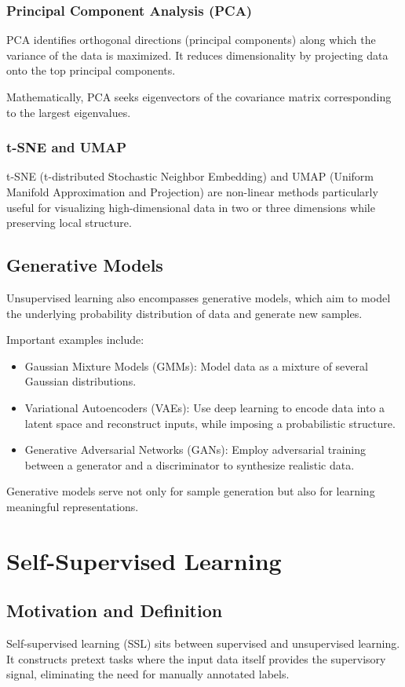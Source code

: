 \documentclass[openany]{book}
\begin{document}
\subsubsection{Principal Component Analysis (PCA)}
PCA identifies orthogonal directions (principal components) along which the 
variance of the data is maximized. It reduces dimensionality by projecting data 
onto the top principal components.

Mathematically, PCA seeks eigenvectors of the covariance matrix corresponding to 
the largest eigenvalues.

\subsubsection{t-SNE and UMAP}
t-SNE (t-distributed Stochastic Neighbor Embedding) and UMAP (Uniform Manifold 
Approximation and Projection) are non-linear methods particularly useful for 
visualizing high-dimensional data in two or three dimensions while preserving 
local structure.

\subsection{Generative Models}
Unsupervised learning also encompasses generative models, which aim to model the 
underlying probability distribution of data and generate new samples.

Important examples include:
\begin{itemize}
    \item Gaussian Mixture Models (GMMs): Model data as a mixture of several 
    Gaussian distributions.
    \item Variational Autoencoders (VAEs): Use deep learning to encode data into 
    a latent space and reconstruct inputs, while imposing a probabilistic 
    structure.
    \item Generative Adversarial Networks (GANs): Employ adversarial training 
    between a generator and a discriminator to synthesize realistic data.
\end{itemize}
Generative models serve not only for sample generation but also for learning 
meaningful representations.

\section{Self-Supervised Learning}

\subsection{Motivation and Definition}
Self-supervised learning (SSL) sits between supervised and unsupervised 
learning. It constructs pretext tasks where the input data itself provides the 
supervisory signal, eliminating the need for manually annotated labels.
\end{document}
